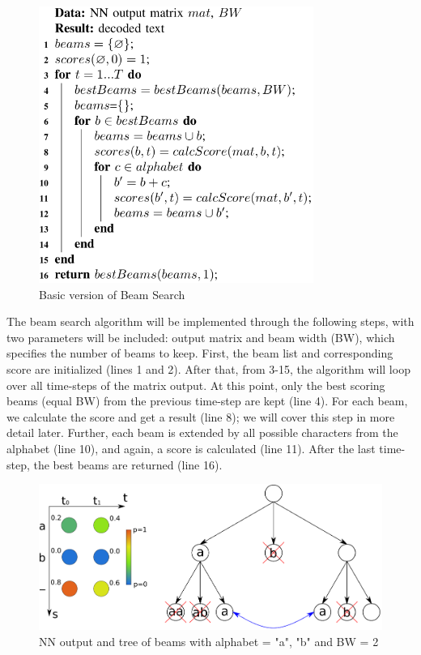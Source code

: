 \begin{figure}[H]
	\centering
	\includegraphics[width=0.8\textwidth]{img/Chap3/Basic-Version-BeamSearch}
	\caption{ Basic version of Beam Search }
	\label{fig:Chap3-Basic-Version-BeamSearch}
\end{figure}


The beam search algorithm will be implemented through the following steps, with two parameters will be included: output matrix and beam width (BW), which specifies the number of beams to keep. First, the beam list and corresponding score are initialized (lines 1 and 2). After that, from 3-15, the algorithm will loop over all time-steps of the matrix output. At this point, only the best scoring beams (equal BW) from the previous time-step are kept (line 4). For each beam, we calculate the score and get a result (line 8); we will cover this step in more detail later. Further, each beam is extended by all possible characters from the alphabet (line 10), and again, a score is calculated (line 11). After the last time-step, the best beams are returned (line 16).


\begin{figure}[H]
	\centering
	\includegraphics[width=\textwidth]{img/Chap3/BeamSearchTree}
	\caption{ NN output and tree of beams with alphabet = {"a", "b"} and BW = 2 }
	\label{fig:Chap3-BSTree}
\end{figure}

